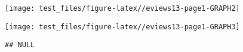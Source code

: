 \documentclass[
]{article}
\newenvironment{Shaded}{\begin{snugshade}}{\end{snugshade}}
\newcommand{\NormalTok}[1]{#1}
\newcommand{\SpecialCharTok}[1]{\textcolor[rgb]{0.00,0.00,0.00}{#1}}
\begin{document}
\begin{center}\texttt{[image: test\_files/figure-latex//eviews13-page1-GRAPH2]} \end{center}

\begin{center}\texttt{[image: test\_files/figure-latex//eviews13-page1-GRAPH3]} \end{center}

\begin{Shaded}
\end{Shaded}

\begin{verbatim}
## NULL
\end{verbatim}
\end{document}
